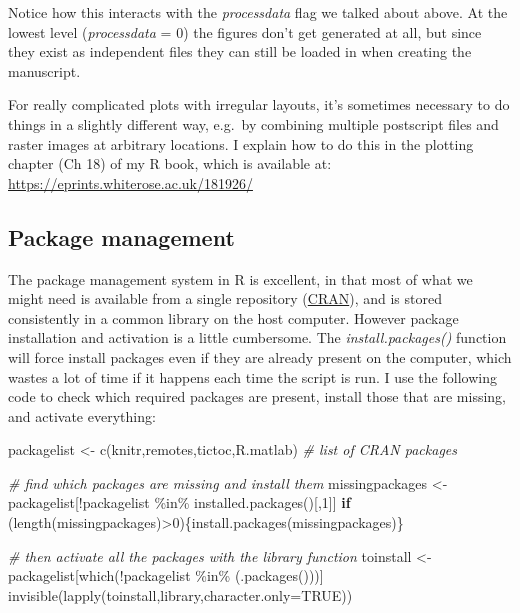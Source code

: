\documentclass[
]{article}
\newenvironment{Shaded}{\begin{snugshade}}{\end{snugshade}}
\newcommand{\AttributeTok}[1]{\textcolor[rgb]{0.77,0.63,0.00}{#1}}
\newcommand{\CommentTok}[1]{\textcolor[rgb]{0.56,0.35,0.01}{\textit{#1}}}
\newcommand{\ConstantTok}[1]{\textcolor[rgb]{0.00,0.00,0.00}{#1}}
\newcommand{\ControlFlowTok}[1]{\textcolor[rgb]{0.13,0.29,0.53}{\textbf{#1}}}
\newcommand{\DecValTok}[1]{\textcolor[rgb]{0.00,0.00,0.81}{#1}}
\newcommand{\FunctionTok}[1]{\textcolor[rgb]{0.00,0.00,0.00}{#1}}
\newcommand{\NormalTok}[1]{#1}
\newcommand{\OtherTok}[1]{\textcolor[rgb]{0.56,0.35,0.01}{#1}}
\newcommand{\SpecialCharTok}[1]{\textcolor[rgb]{0.00,0.00,0.00}{#1}}
\newcommand{\StringTok}[1]{\textcolor[rgb]{0.31,0.60,0.02}{#1}}
\begin{document}
Notice how this interacts with the \emph{processdata} flag we talked about above. At the lowest level (\emph{processdata} = 0) the figures don't get generated at all, but since they exist as independent files they can still be loaded in when creating the manuscript.

For really complicated plots with irregular layouts, it's sometimes necessary to do things in a slightly different way, e.g.~by combining multiple postscript files and raster images at arbitrary locations. I explain how to do this in the plotting chapter (Ch 18) of my R book, which is available at: \url{https://eprints.whiterose.ac.uk/181926/}

\hypertarget{package-management}{%
\subsection{Package management}\label{package-management}}

The package management system in R is excellent, in that most of what we might need is available from a single repository (\href{https://cran.r-project.org/}{CRAN}), and is stored consistently in a common library on the host computer. However package installation and activation is a little cumbersome. The \emph{install.packages()} function will force install packages even if they are already present on the computer, which wastes a lot of time if it happens each time the script is run. I use the following code to check which required packages are present, install those that are missing, and activate everything:

\begin{Shaded}
\begin{Highlighting}[]
\NormalTok{packagelist }\OtherTok{\textless{}{-}} \FunctionTok{c}\NormalTok{(}\StringTok{\textquotesingle{}knitr\textquotesingle{}}\NormalTok{,}\StringTok{\textquotesingle{}remotes\textquotesingle{}}\NormalTok{,}\StringTok{\textquotesingle{}tictoc\textquotesingle{}}\NormalTok{,}\StringTok{\textquotesingle{}R.matlab\textquotesingle{}}\NormalTok{) }\CommentTok{\# list of CRAN packages}

\CommentTok{\# find which packages are missing and install them}
\NormalTok{missingpackages }\OtherTok{\textless{}{-}}\NormalTok{ packagelist[}\SpecialCharTok{!}\NormalTok{packagelist }\SpecialCharTok{\%in\%} \FunctionTok{installed.packages}\NormalTok{()[,}\DecValTok{1}\NormalTok{]]}
\ControlFlowTok{if}\NormalTok{ (}\FunctionTok{length}\NormalTok{(missingpackages)}\SpecialCharTok{\textgreater{}}\DecValTok{0}\NormalTok{)\{}\FunctionTok{install.packages}\NormalTok{(missingpackages)\}}

\CommentTok{\# then activate all the packages with the library function}
\NormalTok{toinstall }\OtherTok{\textless{}{-}}\NormalTok{ packagelist[}\FunctionTok{which}\NormalTok{(}\SpecialCharTok{!}\NormalTok{packagelist }\SpecialCharTok{\%in\%}\NormalTok{ (}\FunctionTok{.packages}\NormalTok{()))]}
\FunctionTok{invisible}\NormalTok{(}\FunctionTok{lapply}\NormalTok{(toinstall,library,}\AttributeTok{character.only=}\ConstantTok{TRUE}\NormalTok{))}
\end{Highlighting}
\end{Shaded}
\end{document}

